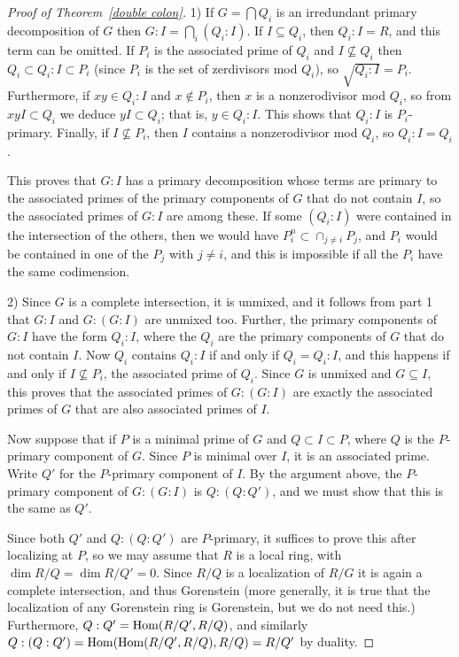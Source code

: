 \begin{proof}[Proof of Theorem~\ref{double colon}]
 1) If $G = \bigcap Q_{i}$ is an irredundant primary decomposition of $G$ then
$G:I = \bigcap_i (Q_{i}:I)$. If $I \subseteq Q_i$, then $Q_{i}:I = R$, and this term can be omitted. If $P_i$ is the associated prime of $Q_i$
and $I \not\subseteq Q_i$ then $ Q_i \subset Q_i:I\subset P_i$ (since $P_i$ is the set of zerdivisors mod $Q_i$), 
so $\sqrt {Q_i:I} = P_i$. Furthermore, if $xy\in Q_i:I$ and $x\notin P_i$, then $x$ is a nonzerodivisor mod $Q_i$, so from
$xyI\subset Q_i$ we deduce $yI\subset Q_i$; that is, $y\in Q_i:I$. This shows that $Q_i:I$ is $P_i$-primary. 
Finally, if $I\not\subseteq P_i$, then $I$ contains a nonzerodivisor mod $Q_i$, so $Q_i:I = Q_i$.

This proves that $G:I$ has a primary decomposition whose terms are primary to the associated primes of the primary
components of $G$ that do not contain $I$, so the associated primes of $G:I$ are among these. If some $(Q_i:I)$ were contained
in the intersection of the others, then we would have $P_i^n \subset \cap_{j\neq i}P_j$, and $P_i$ would be contained in one
of the $P_j$ with $j\neq i$, and this is impossible if all the $P_i$ have the same codimension.
 
 2) Since $G$ is a complete intersection, it is unmixed, and it follows from part 1 that $G:I$ and $G:(G:I)$ are unmixed too. Further,
 the primary components of $G:I$ have the form $Q_i:I$, where the $Q_i$ are the primary components of $G$ that
 do not contain $I$. Now $Q_i$ contains $Q_i:I$ if and only if $Q_i=Q_i:I$, and this happens if and only if
  $I\not\subseteq P_i$,  the associated prime of $Q_i$. Since $G$ is unmixed and $G\subseteq I$, this proves that the associated primes of 
  $G:(G:I)$ are exactly the associated primes of $G$ that are also associated primes of $I$.
  
 Now suppose that if $P$ is a minimal prime of $G$ and $Q \subset I \subset P$, where $Q$ is the $P$-primary
  component of $G$. Since $P$ is minimal over $I$, it is an associated prime. Write $Q'$ for the $P$-primary component
  of $I$. By the argument above, the $P$-primary component of $G:(G:I)$ is $Q:(Q:Q')$, and we must show that this is the
  same as $Q'$.
  
  Since both $Q'$ and $Q:(Q:Q')$ are $P$-primary, it suffices to prove this after localizing at $P$, so we may assume
  that $R$ is a local ring, with $\dim R/Q = \dim R/Q' = 0$. Since $R/Q$ is a localization of $R/G$ it is again a complete
  intersection, and thus Gorenstein (more generally, it is true that the localization of any Gorenstein ring is Gorenstein, but
  we do not need this.)
  Furthermore, $Q:Q' = \operatorname{Hom}(R/Q', R/Q)$, and similarly $Q:(Q:Q') = \operatorname{Hom}(\operatorname{Hom}(R/Q', R/Q), R/Q) = R/Q'$ by duality.
  

\end{proof}
